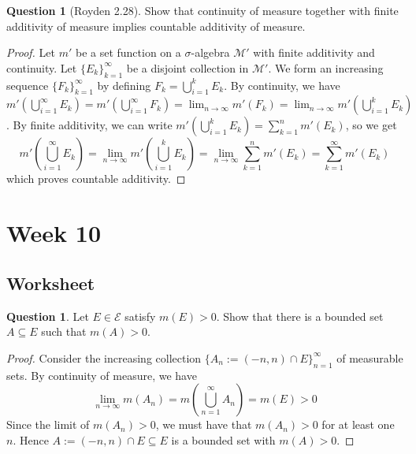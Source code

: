 \documentclass{article}
\theoremstyle{definition} %
\numberwithin{thm}{section} %
\theoremstyle{definition} %
\newtheorem{question}[thm]{Question}
\begin{document}
\begin{question}[Royden 2.28]
Show that continuity of measure together with finite additivity of measure implies countable additivity of measure.
\end{question}
\begin{proof}
Let $m'$ be a set function on a $\sigma$-algebra $\mathcal{M}'$ with finite additivity and continuity. Let ${\{E_k\}}_{k = 1}^\infty$ be a disjoint collection in $\mathcal{M}'$. We form an increasing sequence ${\{F_k\}}_{k = 1}^\infty$ by defining $F_k = \bigcup_{i = 1}^k E_k$. By continuity, we have $m'(\bigcup_{i = 1}^\infty E_k) = m'(\bigcup_{i = 1}^\infty F_k) = \lim_{n \to \infty} m'(F_k) = \lim_{n \to \infty} m'(\bigcup_{i = 1}^k E_k)$. By finite additivity, we can write $m'(\bigcup_{i = 1}^k E_k) = \sum_{k = 1}^n m'(E_k)$, so we get 
\[ m'(\bigcup_{i = 1}^\infty E_k) = \lim_{n \to \infty} m'(\bigcup_{i = 1}^k E_k) = \lim_{n \to \infty} \sum_{k = 1}^n m'(E_k) = \sum_{k = 1}^\infty m'(E_k) \]
which proves countable additivity.
\end{proof}

\section{Week 10}

\subsection{Worksheet}

\begin{question}
Let $E \in \mathcal{E}$ satisfy $m(E) > 0$. Show that there is a bounded set $A \subseteq E$ such that $m(A) > 0$.
\end{question}
\begin{proof}
Consider the increasing collection ${\{A_n := (-n, n) \cap E\}}_{n = 1}^\infty$ of measurable sets. By continuity of measure, we have
\[ \lim_{n \to \infty} m(A_n) = m\left(\bigcup_{n = 1}^\infty A_n\right) = m(E) > 0 \]
Since the limit of $m(A_n) > 0$, we must have that $m(A_n) > 0$ for at least one $n$. Hence $A := (-n, n) \cap E \subseteq E$ is a bounded set with $m(A) > 0$.
\end{proof}
\end{document}
